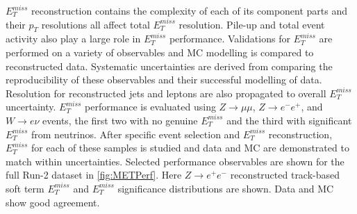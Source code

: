 $E_T^{miss}$ reconstruction contains the complexity of each of its component parts and their $p_T$ resolutions all affect total $E_T^{miss}$ resolution. Pile-up and total event activity also play a large role in $E_T^{miss}$ performance. Validations for $E_T^{miss}$ are performed on a variety of observables and MC modelling is compared to reconstructed data. Systematic uncertainties are derived from comparing the reproducibility of these observables and their successful modelling of data. Resolution for reconstructed jets and leptons are also propagated to overall $E_T^{miss}$ uncertainty. $E_T^{miss}$ performance is evaluated using $Z\rightarrow \mu\mu$, $Z\rightarrow e^-e^+$, and $W\rightarrow e\nu$ events, the first two with no genuine $E_T^{miss}$ and the third with significant $E_T^{miss}$ from neutrinos. After specific event selection and $E_T^{miss}$ reconstruction, $E_T^{miss}$ for each of these samples is studied and data and MC are demonstrated to match within uncertainties. Selected performance observables are shown for the full Run-2 dataset in \ref{fig:METPerf}. Here $Z\rightarrow e^+e^-$ reconstructed track-based soft term $E_T^{miss}$ and $E_T^{miss}$ significance distributions are shown. Data and MC show good agreement.

